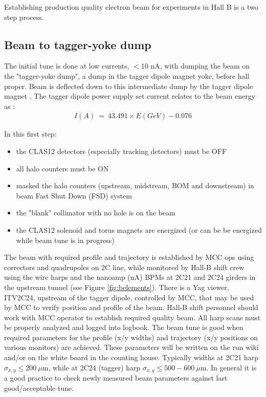 \indent

Establishing production quality electron beam for experiments in Hall B is a two step process. 

\subsection{Beam to tagger-yoke dump}
\indent

The initial tune is done at low currents, $<10$ nA, with dumping the beam on the "tagger-yoke dump", a dump in the tagger dipole magnet yoke, before hall proper. Beam is deflected down to this intermediate dump by the tagger dipole magnet \cite{tagger}. The tagger dipole power supply set current relates to the beam energy as \cite{yokedump}:
\begin{eqnarray}
I(A)~=~43.491\times E(GeV)-0.076
\end{eqnarray}

In this first step:
\begin{itemize}
\item the CLAS12 detectors (especially tracking detectors) must be OFF 
\item all halo counters must be ON
\item masked the halo counters (upstream, midstream, BOM and downstream) in beam Fast Shut Down (FSD) system 
\item the "blank" collimator with no hole is on the beam
\item the CLAS12 solenoid and torus magnets are energized (or can be be energized while beam tune is in progress)
\end{itemize}

The beam with required profile and trajectory is established by MCC ops using correctors and quadrupoles on 2C line, while monitored by Hall-B shift crew using the wire harps and the nanoamp (nA) BPMs \cite{nA_BPM} at 2C21 and 2C24 girders in the upstream tunnel (see  Figure \ref{fig:belements}). There is a Yag viewer, ITV2C24, upstream of the tagger dipole, controlled by MCC, that may be used by MCC to verify position and profile of the beam. Hall-B shift personnel should work with MCC operator to establish required quality beam. All harp scans must be properly analyzed and logged into logbook. The beam tune is good when required parameters for the profile (x/y widths) and trajectory (x/y positions on various monitors) are achieved. These parameters will be written on the run wiki and/or on the white board in the counting house. Typically widths at 2C21 harp $\sigma_{x,y}\le 200~\mu$m, while at 2C24 (tagger) harp $\sigma_{x,y}\le 500-600~\mu$m. In general it is a good practice to check newly measured beam parameters against last good/acceptable tune.  

